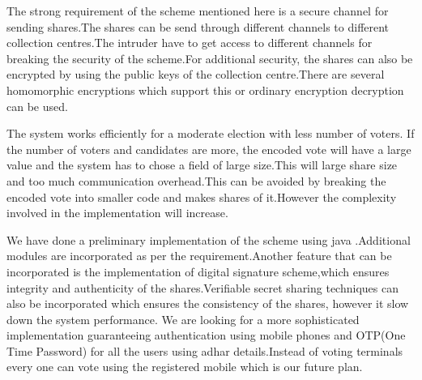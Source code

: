 \documentclass[conference]{IEEEtran}
\begin{document}
The strong requirement of the scheme mentioned here is a secure channel for sending shares.The shares can be send through different channels to different collection centres.The intruder have to get access to  different channels for breaking the security of the scheme.For additional security, the shares can also be encrypted by using the public keys of the collection centre.There are several homomorphic encryptions which support this or ordinary encryption decryption can be used.

The system works efficiently for a moderate election with less number of voters.
If the number of voters and candidates are more, the encoded vote will have a large value and the system has to chose a field of large size.This will large share size and too much communication overhead.This can be avoided by breaking the encoded vote into smaller code and makes shares of it.However the complexity involved in the implementation will increase.

We have done a preliminary implementation of the scheme using java \cite{nair2015improved}.Additional modules are incorporated as per the requirement.Another feature that can be incorporated is the implementation of digital signature scheme,which ensures integrity and authenticity of the shares.Verifiable secret sharing techniques can also be incorporated which ensures the consistency of the shares, however it slow down the system performance. We are looking for a more sophisticated implementation guaranteeing authentication using mobile phones and OTP(One Time Password) for all the users using adhar details.Instead of voting terminals every one can vote using the registered mobile which is our future plan.
\end{document}
